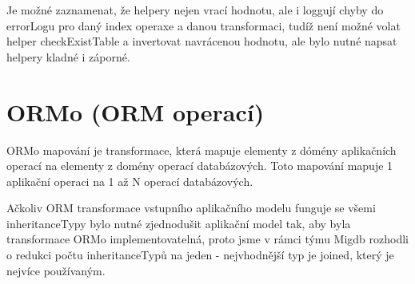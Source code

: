 \documentclass[11pt,twoside,a4paper]{book}
\begin{document}
Je možné zaznamenat, že helpery nejen vrací hodnotu, ale i loggují chyby do
errorLogu pro daný index operaxe a danou transformaci, tudíž není možné volat
helper checkExistTable a invertovat navrácenou hodnotu, ale bylo nutné napsat
helpery kladné i záporné.

\section{ORMo (ORM operací)}\label{ORMo}

ORMo mapování je transformace, která mapuje elementy z dómény aplikačních
operací na elementy z domény operací databázových. Toto mapování mapuje 1
aplikační operaci na 1 až N operací databázových. 

Ačkoliv ORM transformace vstupního aplikačního modelu funguje se všemi
inheritanceTypy bylo nutné zjednodušit aplikační model tak, aby byla
transformace ORMo implementovatelná, proto jsme v rámci týmu Migdb rozhodli o
redukci počtu inheritanceTypů na jeden - nejvhodnější typ je joined, který je
nejvíce používaným.
\end{document}
